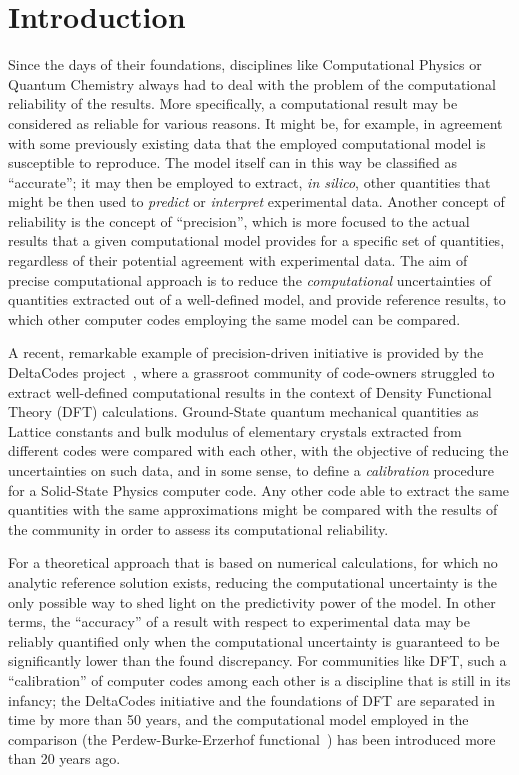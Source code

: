 \documentclass[reprint,aps,prb]{revtex4-1}
\begin{document}
\section{Introduction}
Since the days of their foundations, disciplines like Computational Physics or Quantum Chemistry always had to deal with the problem of the 
computational reliability of the results. More specifically, a computational result may be considered as reliable for various reasons.
It might be, for example, in agreement with some previously existing data that the employed computational model is susceptible to reproduce.
The model itself can in this way be classified as ``accurate''; it may then be employed to extract, \textit{in silico},
other quantities that might be then used to \emph{predict} or \emph{interpret} experimental data.
Another concept of reliability is the concept of  ``precision'', which is more focused to the actual results
that a given computational model provides for a specific set of quantities, regardless of their potential agreement with 
experimental data. The aim of precise computational approach is to reduce the \emph{computational} uncertainties
of quantities extracted out of a well-defined model, and provide reference results, to which other computer codes
employing the same model can be compared.

A recent, remarkable example of precision-driven initiative is provided by the DeltaCodes project~\cite{deltaTest2016},
where a grassroot community of code-owners struggled to extract well-defined computational results in the context of 
Density Functional Theory (DFT) calculations. Ground-State quantum mechanical quantities as Lattice constants and bulk modulus of 
elementary crystals extracted from different codes were compared with each other, with the objective of reducing the uncertainties 
on such data, and in some sense, to define a \emph{calibration} procedure for a Solid-State Physics computer code. 
Any other code able to extract the same quantities with the same approximations might be compared with the 
results of the community in order to assess its computational reliability.

For a theoretical approach that is based on numerical calculations, for which no analytic reference solution exists, 
reducing the computational uncertainty is the only possible way to shed light on the predictivity power of the
model. In other terms, the ``accuracy'' of a result with respect to experimental data may be reliably quantified
only when the computational uncertainty is guaranteed to be significantly lower than the found discrepancy.
For communities like DFT, such a ``calibration'' of computer codes among each other is a discipline that is still in its infancy;
the DeltaCodes initiative and the foundations of DFT are separated in time by more than 50 years, and the computational
model employed in the comparison (the Perdew-Burke-Erzerhof functional~\cite{PBE}) has been introduced more than 20 years ago.
\end{document}
